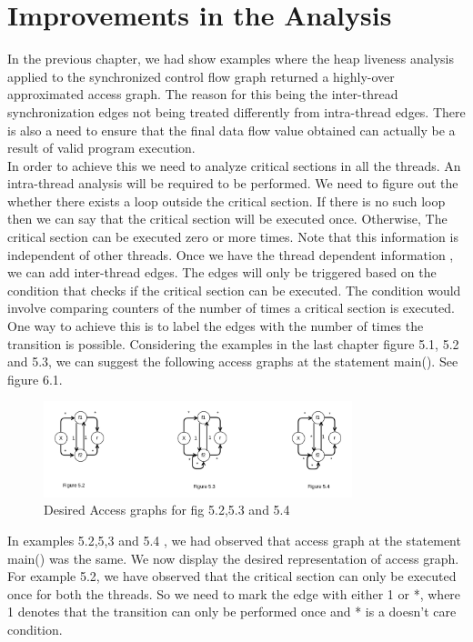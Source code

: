 \chapter{Improvements in the Analysis}

In the previous chapter, we had show examples where the heap liveness analysis applied to the synchronized control flow graph returned a highly-over approximated access graph. The reason for this being the inter-thread synchronization edges not being treated differently from intra-thread edges. There is also a need to ensure that the final data flow value obtained can actually be a result of valid program execution. \\

In order to achieve this we need to analyze critical sections in all the threads. An intra-thread analysis will be required to be performed. We need to figure out the whether there exists a loop outside the critical section. If there is no such loop then we can say that the critical section will be executed once. Otherwise, The critical section can be executed zero or more times. Note that this information is independent of other threads. Once we have the thread dependent information , we can add inter-thread edges. The edges will only be triggered based on the condition that checks if the critical section can be executed. The condition would involve comparing counters of the number of times a critical section is executed. \\

One way to achieve this is to label the edges with the number of times the transition is possible. Considering the examples in the last chapter figure 5.1, 5.2 and 5.3, we can suggest the following access graphs at the statement main(). See figure 6.1. \\


\begin{figure}
	\centering
	\includegraphics[width=0.8\textwidth]{Figures/access_graph_rep.png}
	\caption{Desired Access graphs for fig 5.2,5.3 and 5.4}
	\label{fig:ch5example}
\end{figure}
 
In examples 5.2,5,3 and 5.4 , we had observed that access graph at the statement main() was the same. We now display the desired representation of access graph. For example 5.2, we have observed that the critical section can only be executed once for both the threads. So we need to mark the edge with either 1 or *, where 1 denotes that the transition can only be performed once and * is a doesn't care condition. \\

